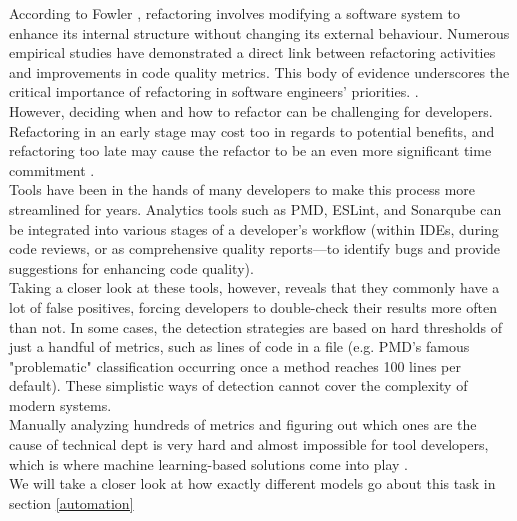 According to Fowler \cite{fowler2018refactoring}, refactoring involves modifying a software system to enhance its internal structure without changing its external behaviour. Numerous empirical studies have demonstrated a direct link between refactoring activities and improvements in code quality metrics. This body of evidence underscores the critical importance of refactoring in software engineers' priorities. \cite{aniche2020effectiveness}.\\
However, deciding when and how to refactor can be challenging for developers. Refactoring in an early stage may cost too in regards to potential benefits, and refactoring too late may cause the refactor to be an even more significant time commitment \cite{kruchten2012technical}.\\
Tools have been in the hands of many developers to make this process more streamlined for years. Analytics tools such as PMD, ESLint, and Sonarqube can be integrated into various stages of a developer's workflow (within IDEs, during code reviews, or as comprehensive quality reports—to identify bugs and provide suggestions for enhancing code quality)\cite{aniche2020effectiveness}.\\
Taking a closer look at these tools, however, reveals that they commonly have a lot of false positives, forcing developers to double-check their results more often than not. In some cases, the detection strategies are based on hard thresholds of just a handful of metrics, such as lines of code in a file (e.g. PMD's famous "problematic" classification occurring once a method reaches 100 lines per default)\cite{aniche2020effectiveness}. These simplistic ways of detection cannot cover the complexity of modern systems.\\
Manually analyzing hundreds of metrics and figuring out which ones are the cause of technical dept is very hard and almost impossible for tool developers, which is where machine learning-based solutions come into play \cite{leitch2003maintainability}.\\
We will take a closer look at how exactly different models go about this task in section \ref{automation}
